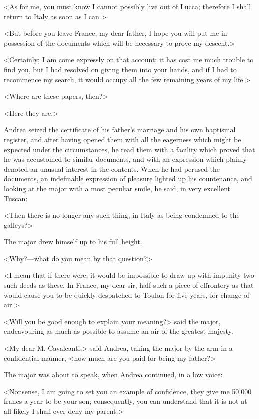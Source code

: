  <As for me, you must know I cannot possibly live out of Lucca; therefore I shall return to Italy as soon as I can.> 

 <But before you leave France, my dear father, I hope you will put me in possession of the documents which will be necessary to prove my descent.> 

 <Certainly; I am come expressly on that account; it has cost me much trouble to find you, but I had resolved on giving them into your hands, and if I had to recommence my search, it would occupy all the few remaining years of my life.> 

 <Where are these papers, then?> 

 <Here they are.> 

 Andrea seized the certificate of his father's marriage and his own baptismal register, and after having opened them with all the eagerness which might be expected under the circumstances, he read them with a facility which proved that he was accustomed to similar documents, and with an expression which plainly denoted an unusual interest in the contents. When he had perused the documents, an indefinable expression of pleasure lighted up his countenance, and looking at the major with a most peculiar smile, he said, in very excellent Tuscan: 

 <Then there is no longer any such thing, in Italy as being condemned to the galleys?> 

 The major drew himself up to his full height. 

 <Why?—what do you mean by that question?> 

 <I mean that if there were, it would be impossible to draw up with impunity two such deeds as these. In France, my dear sir, half such a piece of effrontery as that would cause you to be quickly despatched to Toulon for five years, for change of air.> 

 <Will you be good enough to explain your meaning?> said the major, endeavouring as much as possible to assume an air of the greatest majesty. 

 <My dear M. Cavalcanti,> said Andrea, taking the major by the arm in a confidential manner, <how much are you paid for being my father?> 

 The major was about to speak, when Andrea continued, in a low voice: 

 <Nonsense, I am going to set you an example of confidence, they give me 50,000 francs a year to be your son; consequently, you can understand that it is not at all likely I shall ever deny my parent.> 

